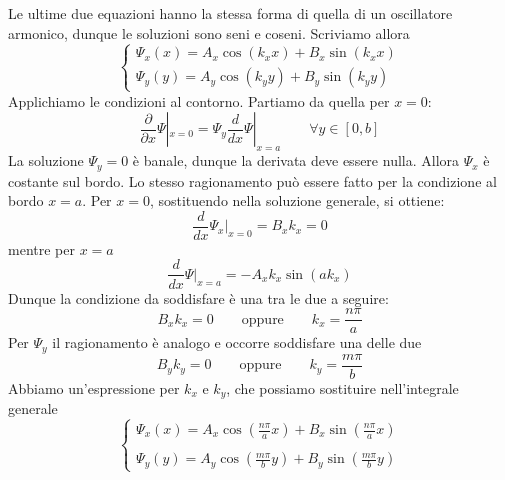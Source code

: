 \documentclass{book}
\begin{document}
    Le ultime due equazioni hanno la stessa forma di quella di un oscillatore armonico, dunque le 
    soluzioni sono seni e coseni. Scriviamo allora
    \begin{equation}
        \begin{cases}
            \displaystyle \Psi_{x}(x) = A_{x}\cos(k_{x}x)+B_{x}\sin(k_{x}x) \\
            \displaystyle \Psi_{y}(y) = A_{y}\cos(k_{y}y)+B_{y}\sin(k_{y}y)
        \end{cases}
    \end{equation}
    Applichiamo le condizioni al contorno. Partiamo da quella per $x=0$:
    \begin{equation}
        \frac{\partial}{\partial x}\Psi|_{x=0} =\Psi_{y} \frac{d}{dx}\Psi|_{x=a} \qquad \forall y \in [0, b] 
    \end{equation}
    La soluzione $\Psi_{y}=0$ è banale, dunque la derivata deve essere nulla. Allora $\Psi_{x}$ è costante sul bordo. 
    Lo stesso ragionamento può essere fatto per la condizione al bordo $x=a$. Per $x=0$, sostituendo nella soluzione generale, si ottiene:
    \begin{equation}
        \frac{d}{dx}\Psi_{x}|_{x=0} = B_{x}k_{x} = 0
    \end{equation}
    mentre per $x=a$
    \begin{equation}
        \frac{d}{dx}\Psi|_{x=a} = -A_{x}k_{x}\sin(ak_{x})
    \end{equation}
    Dunque la condizione da soddisfare è una tra le due a seguire:
    \begin{equation}
        B_{x}k_{x} = 0 \qquad \textrm{oppure} \qquad k_{x}=\frac{n\pi}{a}
    \end{equation}
    Per $\Psi_{y}$ il ragionamento è analogo e occorre soddisfare una delle due
    \begin{equation}
        B_{y}k_{y} = 0 \qquad \textrm{oppure} \qquad k_{y} = \frac{m \pi}{b}
    \end{equation}
    Abbiamo un'espressione per $k_{x}$ e $k_{y}$, che possiamo sostituire nell'integrale generale
    \begin{equation}
        \begin{cases}
            \displaystyle \Psi_{x}(x) = A_{x}\cos(\frac{n \pi}{a}x)+B_{x}\sin(\frac{n \pi}{a}x) \\
            \\
            \displaystyle \Psi_{y}(y) = A_{y}\cos(\frac{m\pi}{b}y)+B_{y}\sin(\frac{m\pi}{b}y)
        \end{cases}
    \end{equation}
\end{document}
